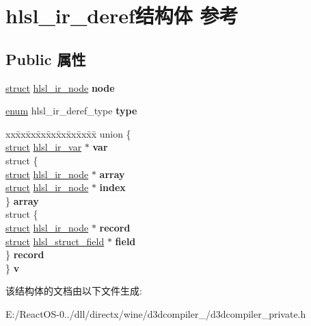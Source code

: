 \hypertarget{structhlsl__ir__deref}{}\section{hlsl\+\_\+ir\+\_\+deref结构体 参考}
\label{structhlsl__ir__deref}
\subsection*{Public 属性}
\begin{DoxyCompactItemize}
\item 
\mbox{\label{structhlsl__ir__deref_aecd475482bd567c64ed86ac880c6fbdb}} 
\hyperlink{interfacestruct}{struct} \hyperlink{structhlsl__ir__node}{hlsl\+\_\+ir\+\_\+node} {\bfseries node}
\item 
\mbox{\label{structhlsl__ir__deref_ab57e29041609c6277bc396c59f2754df}} 
\hyperlink{interfaceenum}{enum} hlsl\+\_\+ir\+\_\+deref\+\_\+type {\bfseries type}
\item 
\mbox{\label{structhlsl__ir__deref_a543afcdcd082d62d5781a2f26841aa18}} 
\begin{tabbing}
xx\=xx\=xx\=xx\=xx\=xx\=xx\=xx\=xx\=\kill
union \{\\
\>\hyperlink{interfacestruct}{struct} \hyperlink{structhlsl__ir__var}{hlsl\_ir\_var} $\ast$ {\bfseries var}\\
\>struct \{\\
\>\>\hyperlink{interfacestruct}{struct} \hyperlink{structhlsl__ir__node}{hlsl\_ir\_node} $\ast$ {\bfseries array}\\
\>\>\hyperlink{interfacestruct}{struct} \hyperlink{structhlsl__ir__node}{hlsl\_ir\_node} $\ast$ {\bfseries index}\\
\>\} {\bfseries array}\\
\>struct \{\\
\>\>\hyperlink{interfacestruct}{struct} \hyperlink{structhlsl__ir__node}{hlsl\_ir\_node} $\ast$ {\bfseries record}\\
\>\>\hyperlink{interfacestruct}{struct} \hyperlink{structhlsl__struct__field}{hlsl\_struct\_field} $\ast$ {\bfseries field}\\
\>\} {\bfseries record}\\
\} {\bfseries v}\\

\end{tabbing}\end{DoxyCompactItemize}


该结构体的文档由以下文件生成\+:\begin{DoxyCompactItemize}
\item 
E\+:/\+React\+O\+S-\/0../dll/directx/wine/d3dcompiler\+\_/d3dcompiler\+\_\+private.\+h\end{DoxyCompactItemize}
